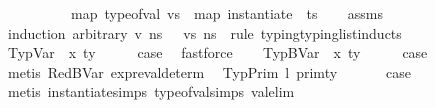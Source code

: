 \begin{isabellebody}
\ \ \ \ \ \ \ \ \ \ map\ {\isacharparenleft}{\kern0pt}type{\isacharunderscore}{\kern0pt}of{\isacharunderscore}{\kern0pt}val{\isacharparenright}{\kern0pt}\ vs\ {\isacharequal}{\kern0pt}\ {\isacharparenleft}{\kern0pt}map\ {\isacharparenleft}{\kern0pt}instantiate\ {\isasymOmega}{\isacharparenright}{\kern0pt}\ ts{\isacharparenright}{\kern0pt}{\isachardoublequoteclose}\isanewline
%
\isadelimproof
\ \ %
\endisadelimproof
%
\isatagproof
{}\isamarkupfalse%
\ assms\isanewline
{}\isamarkupfalse%
\ {\isacharparenleft}{\kern0pt}induction\ arbitrary{\isacharcolon}{\kern0pt}\ v\ n{\isacharunderscore}{\kern0pt}s\ {\isasymOmega}\ \ vs\ n{\isacharunderscore}{\kern0pt}s\ {\isasymOmega}\ rule{\isacharcolon}{\kern0pt}\ typing{\isacharunderscore}{\kern0pt}typing{\isacharunderscore}{\kern0pt}list{\isachardot}{\kern0pt}inducts{\isacharparenright}{\kern0pt}\isanewline
\ \ \isamarkupfalse%
\ {\isacharparenleft}{\kern0pt}TypVar\ {\isasymDelta}\ x\ ty{\isacharparenright}{\kern0pt}\isanewline
\ \ \isamarkupfalse%
\ \isamarkupfalse%
\ {\isacharquery}{\kern0pt}case\ \isamarkupfalse%
\ fastforce\isanewline
{}\isamarkupfalse%
\isanewline
\ \ \isamarkupfalse%
\ {\isacharparenleft}{\kern0pt}TypBVar\ {\isasymDelta}\ x\ ty{\isacharparenright}{\kern0pt}\isanewline
\ \ \isamarkupfalse%
\ \isamarkupfalse%
\ {\isacharquery}{\kern0pt}case\isanewline
\ \ \ \ \isamarkupfalse%
\ {\isacharparenleft}{\kern0pt}metis\ RedBVar\ expr{\isacharunderscore}{\kern0pt}eval{\isacharunderscore}{\kern0pt}determ{\isacharparenleft}{\kern0pt}{}{\isacharparenright}{\kern0pt}{\isacharparenright}{\kern0pt}\ \isanewline
{}\isamarkupfalse%
\isanewline
{}\isamarkupfalse%
\ {\isacharparenleft}{\kern0pt}TypPrim\ l\ prim{\isacharunderscore}{\kern0pt}ty\ {\isasymDelta}{\isacharparenright}{\kern0pt}\isanewline
\ \ \isamarkupfalse%
\ \isamarkupfalse%
\ {\isacharquery}{\kern0pt}case\isanewline
\ \ \ \ \isamarkupfalse%
\ {\isacharparenleft}{\kern0pt}metis\ instantiate{\isachardot}{\kern0pt}simps{\isacharparenleft}{\kern0pt}{}{\isacharparenright}{\kern0pt}\ type{\isacharunderscore}{\kern0pt}of{\isacharunderscore}{\kern0pt}val{\isachardot}{\kern0pt}simps{\isacharparenleft}{\kern0pt}{}{\isacharparenright}{\kern0pt}\ val{\isacharunderscore}{\kern0pt}elim{\isacharparenright}{\kern0pt}\isanewline

\end{isabellebody}

